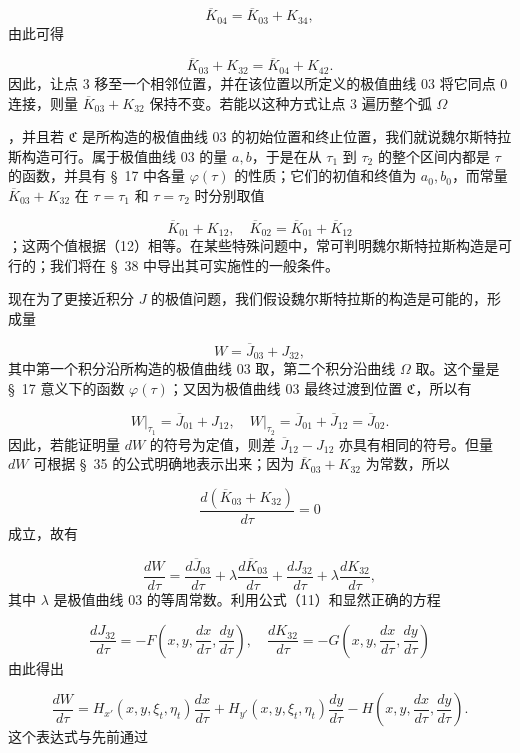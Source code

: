 \documentclass[11pt,a4paper,leqno]{article}
\begin{document}
\[
\overline{K}_{04}=\overline{K}_{03}+K_{34},
\]
由此可得

\[
\overline{K}_{03}+K_{32}=\overline{K}_{04}+K_{42}.
\]
因此，让点 3 移至一个相邻位置，并在该位置以所定义的极值曲线 03 将它同点 0 连接，则量 $\overline{K}_{03}+K_{32}$ 保持不变。若能以这种方式让点 3 遍历整个弧 $\Omega$

，并且若 $\mathfrak{C}$ 是所构造的极值曲线 03 的初始位置和终止位置，我们就说魏尔斯特拉斯构造可行。属于极值曲线 03 的量 $a,b$，于是在从 $\tau_1$ 到 $\tau_2$ 的整个区间内都是 $\tau$ 的函数，并具有 \S~17 中各量 $\varphi(\tau)$ 的性质；它们的初值和终值为 $a_0,b_0$，而常量 $\overline{K}_{03}+K_{32}$ 在 $\tau=\tau_1$ 和 $\tau=\tau_2$ 时分别取值

\[
\overline{K}_{01}+K_{12},
\quad
\overline{K}_{02}=\overline{K}_{01}+\overline{K}_{12}
\]
；这两个值根据（12）相等。在某些特殊问题中，常可判明魏尔斯特拉斯构造是可行的；我们将在 \S~38 中导出其可实施性的一般条件。

现在为了更接近积分 $J$ 的极值问题，我们假设魏尔斯特拉斯的构造是可能的，形成量

\[
W=\overline{J}_{03}+J_{32},
\]
其中第一个积分沿所构造的极值曲线 03 取，第二个积分沿曲线 $\Omega$ 取。这个量是 \S~17 意义下的函数 $\varphi(\tau)$；又因为极值曲线 03 最终过渡到位置 $\mathfrak{C}$，所以有

\[
W\bigg|_{\tau_1}=\overline{J}_{01}+J_{12},
\quad
W\bigg|_{\tau_2}=\overline{J}_{01}+\overline{J}_{12}=\overline{J}_{02}.
\]
因此，若能证明量 $dW$ 的符号为定值，则差 $\overline{J}_{12}-J_{12}$ 亦具有相同的符号。但量 $dW$ 可根据 \S~35 的公式明确地表示出来；因为 $\overline{K}_{03}+K_{32}$ 为常数，所以

\[
\frac{d(\overline{K}_{03}+K_{32})}{d\tau}=0
\]
成立，故有

\[
\frac{dW}{d\tau}=\frac{d\overline{J}_{03}}{d\tau}+\lambda\frac{d\overline{K}_{03}}{d\tau}
+\frac{dJ_{32}}{d\tau}+\lambda\frac{dK_{32}}{d\tau},
\]
其中 $\lambda$ 是极值曲线 03 的等周常数。利用公式（11）和显然正确的方程

\[
\frac{dJ_{32}}{d\tau}=-F\left(x,y,\frac{dx}{d\tau},\frac{dy}{d\tau}\right),
\quad
\frac{dK_{32}}{d\tau}=-G\left(x,y,\frac{dx}{d\tau},\frac{dy}{d\tau}\right)
\]
由此得出

\begin{equation}\tag{14}
\frac{dW}{d\tau}=H_{x'}(x,y,\xi_t,\eta_t)\frac{dx}{d\tau}
+H_{y'}(x,y,\xi_t,\eta_t)\frac{dy}{d\tau}
-H\left(x,y,\frac{dx}{d\tau},\frac{dy}{d\tau}\right).
\end{equation}
这个表达式与先前通过
\end{document}
